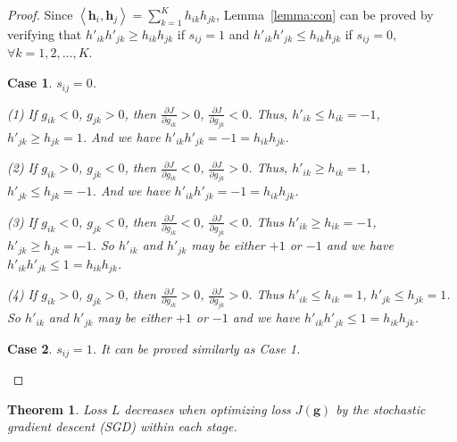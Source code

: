 \documentclass[10pt,twocolumn,letterpaper]{article}
\newtheorem{theorem}{Theorem}
\newtheorem{remark}{Case}
\begin{document}
\begin{proof}
Since $\left\langle {{\bm{h}}_i, {\bm{h}}_j} \right\rangle  = \sum\nolimits_{k = 1}^K {{h}_{ik} {h}_{jk}}$, Lemma~\ref{lemma:con} can be proved by verifying that ${h'_{ik}}{h'_{jk}} \geqslant {h_{ik}}{h_{jk}}$ if $s_{ij}=1$ and ${h'_{ik}}{h'_{jk}} \leqslant {h_{ik}}{h_{jk}}$ if $s_{ij}=0$, $\forall k = 1,2,\ldots,K$.

\begin{remark} ${s_{ij}} = 0$.

(1) If $g_{ik} < 0$, $g_{jk} > 0$, then $\frac{{\partial J}}{{\partial {g_{ik}}}} > 0$, $\frac{{\partial J}}{{\partial {g_{jk}}}} < 0$. Thus, ${{{h}}'_{ik}} \leqslant {{h}_{ik}}=-1$, ${{{h}}'_{jk}} \geqslant {{h}_{jk}}=1$. And we have ${{{h}}'_{ik}} {{{h}}'_{jk}} = -1 = {{h}_{ik}} {{h}_{jk}}$.

(2) If $g_{ik} > 0$, $g_{jk} < 0$, then $\frac{{\partial J}}{{\partial {g_{ik}}}} < 0$, $\frac{{\partial J}}{{\partial {g_{jk}}}} > 0$. Thus, ${{{h}}'_{ik}} \geqslant {{h}_{ik}}=1$, $ {{{h}}'_{jk}} \leqslant {{h}_{jk}}=-1$. And we have ${{{h}}'_{ik}} {{{h}}'_{jk}} = -1 = {{h}_{ik}} {{h}_{jk}}$.

(3) If $g_{ik} < 0$, $g_{jk} < 0$, then $\frac{{\partial J}}{{\partial {g_{ik}}}} < 0$, $\frac{{\partial J}}{{\partial {g_{jk}}}} < 0$. Thus ${{{h}}'_{ik}} \geqslant {{h}_{ik}}=-1$, $ {{{h}}'_{jk}} \geqslant {{h}_{jk}}=-1$. So ${{{h}}'_{ik}}$ and ${{{h}}'_{jk}}$ may be either $+1$ or $-1$ and we have ${{{h}}'_{ik}} {{{h}}'_{jk}} \leqslant 1 = {{h}_{ik}} {{h}_{jk}}$.

(4) If $g_{ik} > 0$, $g_{jk} > 0$, then $\frac{{\partial J}}{{\partial {g_{ik}}}} > 0$, $\frac{{\partial J}}{{\partial {g_{jk}}}} > 0$. Thus ${{{h}}'_{ik}} \leqslant {{h}_{ik}}=1$, $ {{{h}}'_{jk}} \leqslant {{h}_{jk}}=1$. So ${{{h}}'_{ik}}$ and ${{{h}}'_{jk}}$ may be either $+1$ or $-1$ and we have ${{{h}}'_{ik}} {{{h}}'_{jk}} \leqslant 1 = {{h}_{ik}} {{h}_{jk}}$.
\end{remark}

\begin{remark} ${s_{ij}} = 1$. It can be proved similarly as Case 1.
\end{remark}
\vspace{-10pt}
\end{proof}

\begin{theorem}\label{the:converge}
Loss $L$ decreases when optimizing loss $J({\bm g})$ by the stochastic gradient descent (SGD) within each stage.
\end{theorem}
\end{document}

